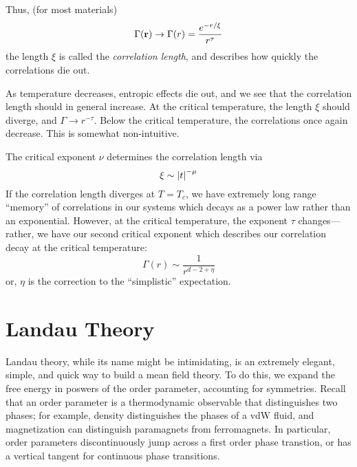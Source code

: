 Thus, (for most materials)
\begin{equation}
	\Gamma(\mathbf{r})\rightarrow \Gamma(r) = \frac{e^{-r/\xi}}{r^\tau}
\end{equation}
the length \(\xi\) is called the \emph{correlation length}, and describes how quickly the correlations die out.

As temperature decreases, entropic effects die out, and we see that the correlation length should in general increase. At the critical temperature, the length \(\xi\) should diverge, and \(\Gamma\to r^{-\tau}\). Below the critical temperature, the correlations once again decrease. This is somewhat non-intuitive.

The critical exponent \(\nu\) determines the correlation length via
\begin{equation}
	\xi\sim \left|t\right|^{-\mu}
\end{equation}
If the correlation length diverges at \(T=T_c\), we have extremely long range ``memory'' of correlations in our systems which decays as a power law rather than an exponential. However, at the critical temperature, the exponent \(\tau\) changes---rather, we have our second critical exponent which describes our correlation decay at the critical temperature:
\begin{equation}
	\Gamma(r)\sim \frac{1}{r^{d-2+\eta}}
\end{equation}
or, \(\eta\) is the correction to the ``simplistic'' expectation.

\section{Landau Theory}
Landau theory, while its name might be intimidating, is an extremely elegant, simple, and quick way to  build a mean field theory. To do this, we expand the free energy in poswers of the order parameter, accounting for symmetries. Recall that an order parameter is a thermodynamic observable that distinguishes two phases; for example, density distinguishes the phases of a vdW fluid, and magnetization can distinguish paramagnets from ferromagnets. In particular, order parameters discontinuously jump across a first order phase transtion, or has a vertical tangent for continuous phase transitions.

